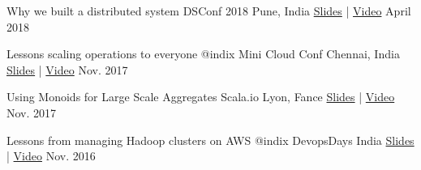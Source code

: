 

\begin{cvhonors}

  \cvhonor
    {Why we built a distributed system} %
    {DSConf 2018 Pune, India} %
    {\href{https://speakerdeck.com/ashwanthkumar/why-we-built-a-distributed-system-dsconf-2018}{Slides} | \href{https://www.youtube.com/watch?v=zSgxt9JsTPg&index=11&list=PLyMKpkdEV2csQg93bEPv2R27sawxIm9zG}{Video}} %
    {April 2018} %


  \cvhonor
    {Lessons scaling operations to everyone @indix} %
    {Mini Cloud Conf Chennai, India} %
    {\href{https://speakerdeck.com/ashwanthkumar/lessons-scaling-operations-to-everyone-at-indix}{Slides} | \href{https://www.youtube.com/watch?v=zUTz1eqwBkI}{Video}} %
    {Nov. 2017} %


  \cvhonor
    {Using Monoids for Large Scale Aggregates} %
    {Scala.io Lyon, Fance} %
    {\href{https://speakerdeck.com/ashwanthkumar/using-monoids-for-large-scale-aggregates}{Slides} | \href{https://www.youtube.com/watch?v=UW3Z_rIPn3w}{Video}} %
    {Nov. 2017} %

  \cvhonor
    {Lessons from managing Hadoop clusters on AWS @indix} %
    {DevopsDays India} %
    {\href{http://bit.ly/autoscaling-on-aws}{Slides} | \href{https://www.youtube.com/watch?v=eBbgylpRufQ}{Video}} %
    {Nov. 2016} %

\end{cvhonors}
